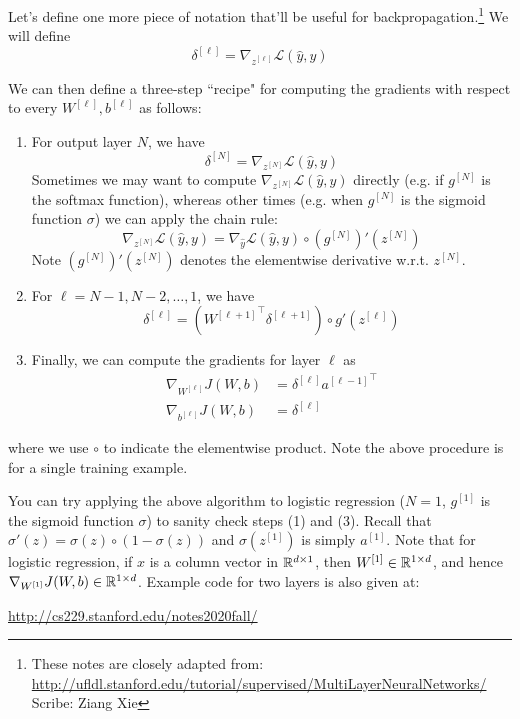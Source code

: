 \documentclass{article}
\numberwithin{equation}{section}
\begin{document}
Let's define one more piece of notation that'll be useful for
backpropagation.\footnote{These notes are closely adapted from:\\\url{http://ufldl.stanford.edu/tutorial/supervised/MultiLayerNeuralNetworks/}\\Scribe: Ziang Xie}
We will define
$$\delta^{[\ell]} = \nabla_{z^{[\ell]}} \mathcal{L}(\hat{y}, y)$$

We can then define a three-step  ``recipe" for computing the gradients with respect to
every $W^{[\ell]}, b^{[\ell]}$ as follows:
\begin{enumerate}
  \item For output layer $N$, we have
    $$\delta^{[N]} = \nabla_{z^{[N]}} \mathcal{L}(\hat{y}, y)$$
    Sometimes we may want to compute $\nabla_{z^{[N]}} \mathcal{L}(\hat{y}, y)$ directly
    (e.g. if $g^{[N]}$ is the softmax function),
    whereas other times (e.g. when $g^{[N]}$ is the sigmoid function $\sigma$)
    we can apply the chain rule:
    $$\nabla_{z^{[N]}} \mathcal{L}(\hat{y}, y) = \nabla_{\hat{y}} \mathcal{L}(\hat{y}, y) \circ (g^{[N]})'(z^{[N]})$$
    Note $(g^{[N]})'(z^{[N]})$ denotes the elementwise derivative w.r.t. $z^{[N]}$.
  \item For $\ell = N-1, N-2, \dots, 1$, we have
    $$\delta^{[\ell]} = ({W^{[\ell+1]}}^\top \delta^{[\ell + 1]}) \circ g'(z^{[\ell]})$$
  \item Finally, we can compute the gradients for layer $\ell$ as
    \begin{align*}
      \nabla_{W^{[\ell]}} J(W, b) &= \delta^{[\ell]} {a^{[\ell-1]}}^\top\\
      \nabla_{b^{[\ell]}} J(W, b) &= \delta^{[\ell]}
    \end{align*}
\end{enumerate}
where we use $\circ$ to indicate the elementwise product.
Note the above procedure is for a single training example.

You can try applying the above algorithm to logistic regression
($N=1$, $g^{[1]}$ is the sigmoid function $\sigma$) to sanity check steps (1) and (3).
Recall that $\sigma'(z) = \sigma(z) \circ (1-\sigma(z))$ and $\sigma(z^{[1]})$ is simply $a^{[1]}$.
Note that for logistic regression, if $x$ is a column vector in $\mathbb{R}^{{d}\times 1}$, then
$W^{[1]} \in \mathbb{R}^{1 \times {d}}$, and hence $\nabla_{W^{[1]}} J(W, b) \in \mathbb{R}^{1 \times {d}}$.
Example code for two layers is also given at:
\begin{center}
\url{http://cs229.stanford.edu/notes2020fall/}
\end{center}

\end{document}
